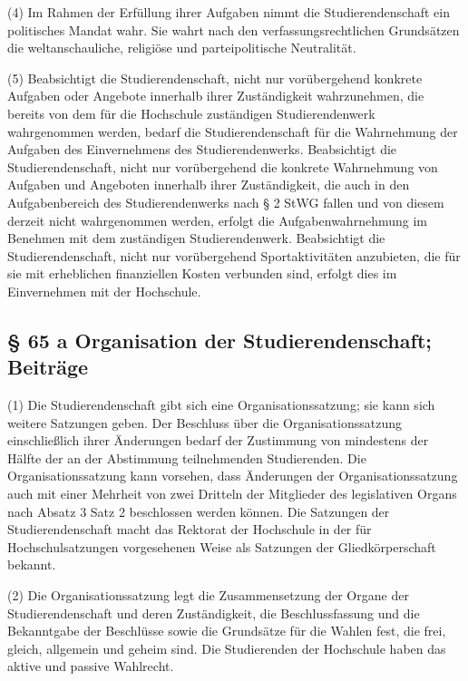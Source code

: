 \documentclass[
10pt,
a4paper,
twoside,								%
titlepage=false,							%
draft=false								%
]{scrartcl}
\begin{document}
(4) Im Rahmen der Erfüllung ihrer Aufgaben nimmt die Studierendenschaft ein politisches Mandat wahr. Sie wahrt nach den verfassungsrechtlichen Grundsätzen die weltanschauliche, religiöse und parteipolitische Neutralität.

(5) Beabsichtigt die Studierendenschaft, nicht nur vorübergehend konkrete Aufgaben oder Angebote innerhalb ihrer Zuständigkeit wahrzunehmen, die bereits von dem für die Hochschule zuständigen Studierendenwerk wahrgenommen werden, bedarf die Studierendenschaft für die Wahrnehmung der Aufgaben des Einvernehmens des Studierendenwerks. Beabsichtigt die Studierendenschaft, nicht nur vorübergehend die konkrete Wahrnehmung von Aufgaben und Angeboten innerhalb ihrer Zuständigkeit, die auch in den Aufgabenbereich des Studierendenwerks nach § 2 StWG fallen und von diesem derzeit nicht wahrgenommen werden, erfolgt die Aufgabenwahrnehmung im Benehmen mit dem zuständigen Studierendenwerk. Beabsichtigt die Studierendenschaft, nicht nur vorübergehend Sportaktivitäten anzubieten, die für sie mit erheblichen finanziellen Kosten verbunden sind, erfolgt dies im Einvernehmen mit der Hochschule.


\subsection{§ 65 a Organisation der Studierendenschaft; Beiträge}

(1) Die Studierendenschaft gibt sich eine Organisationssatzung; sie kann sich weitere Satzungen geben. Der Beschluss über die Organisationssatzung einschließlich ihrer Änderungen bedarf der Zustimmung von mindestens der Hälfte der an der Abstimmung teilnehmenden Studierenden. Die Organisationssatzung kann vorsehen, dass Änderungen der Organisationssatzung auch mit einer Mehrheit von zwei Dritteln der Mitglieder des legislativen Organs nach Absatz 3 Satz 2 beschlossen werden können. Die Satzungen der Studierendenschaft macht das Rektorat der Hochschule in der für Hochschulsatzungen vorgesehenen Weise als Satzungen der Gliedkörperschaft bekannt.

(2) Die Organisationssatzung legt die Zusammensetzung der Organe der Studierendenschaft und deren Zuständigkeit, die Beschlussfassung und die Bekanntgabe der Beschlüsse sowie die Grundsätze für die Wahlen fest, die frei, gleich, allgemein und geheim sind. Die Studierenden der Hochschule haben das aktive und passive Wahlrecht.
\end{document}
